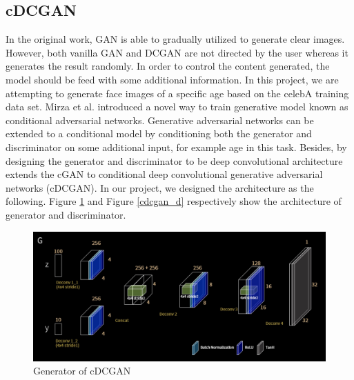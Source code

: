 \documentclass{article}
\begin{document}
\subsection{cDCGAN}
In the original work, GAN is able to gradually utilized to generate clear images. However, both vanilla GAN and DCGAN are not directed by the user whereas it generates the result randomly. In order to control the content generated, the model should be feed with some additional information. In this project, we are attempting to generate face images of a specific age based on the celebA training data set. Mirza et al.\cite{2014arXiv1411.1784M} introduced a novel way to train generative model known as conditional adversarial networks. Generative adversarial networks can be extended to a conditional model by conditioning both the generator and discriminator on some additional input, for example age in this task. Besides, by designing the generator and discriminator to be deep convolutional architecture extends the cGAN to conditional deep convolutional generative adversarial networks (cDCGAN). In our project, we designed the architecture as the following. Figure \ref{cdcgan_g} and Figure \ref{cdcgan_d} respectively show the architecture of generator and discriminator.

\begin{figure}[H]
\begin{center}
  \centering
  \includegraphics[scale=0.2]{image/cdcgan_g.png}
\end{center}
\caption{Generator of cDCGAN}
\label{cdcgan_g}
\end{figure}
\end{document}
